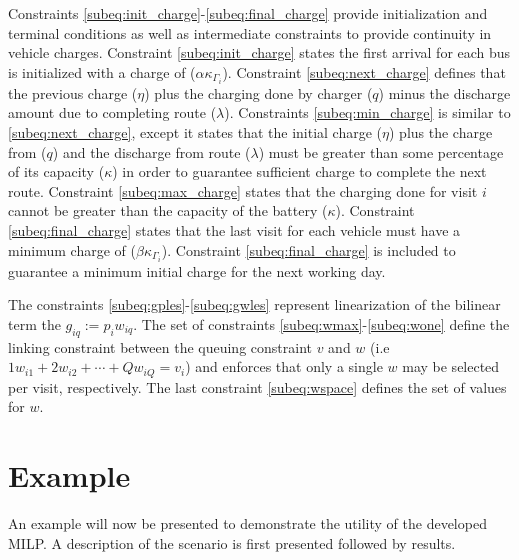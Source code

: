 \documentclass[letterpaper, 10pt, conference]{IEEEtran}
\begin{document}
Constraints \eqref{subeq:init_charge}-\eqref{subeq:final_charge} provide initialization and terminal conditions as well as intermediate constraints to provide continuity in vehicle charges. Constraint \eqref{subeq:init_charge} states the first arrival for each bus is initialized with a charge of (\(\alpha \kappa_{\Gamma_i}\)). Constraint \eqref{subeq:next_charge} defines that the previous charge (\(\eta\)) plus the charging done by charger (\(q\)) minus the discharge amount due to completing route (\(\lambda\)). Constraints \eqref{subeq:min_charge} is similar to \eqref{subeq:next_charge}, except it states that the initial charge (\(\eta\)) plus the charge from (\(q\)) and the discharge from route (\(\lambda\)) must be greater than some percentage of its capacity (\(\kappa\)) in order to guarantee sufficient charge to complete the next route. Constraint \eqref{subeq:max_charge} states that the charging done for visit \(i\) cannot be greater than the capacity of the battery (\(\kappa\)). Constraint \eqref{subeq:final_charge} states that the last visit for each vehicle must have a minimum charge of (\(\beta \kappa_{\Gamma_i}\)). Constraint \eqref{subeq:final_charge} is included to guarantee a minimum initial charge for the next working day.

The constraints \eqref{subeq:gples}-\eqref{subeq:gwles} represent linearization of the bilinear term the \(g_{iq} := p_i w_{iq}\). The set of constraints \eqref{subeq:wmax}-\eqref{subeq:wone} define the linking constraint between the queuing constraint \(v\) and \(w\) (i.e \(1w_{i1} + 2w_{i2} + \cdots + Qw_{iQ} = v_i\)) and enforces that only a single \(w\) may be selected per visit, respectively. The last constraint \eqref{subeq:wspace} defines the set of values for \(w\).

\section{Example}
\label{sec:example}

An example will now be presented to demonstrate the utility of the developed MILP. A description of the scenario is first presented followed by results.
\end{document}
